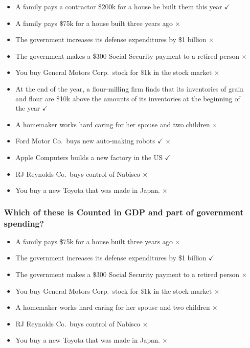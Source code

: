 \documentclass[
  letterpaper,
  DIV=11,
  numbers=noendperiod]{scrartcl}
\providecommand{\tightlist}{%
  \setlength{\itemsep}{0pt}\setlength{\parskip}{0pt}}\usepackage{longtable,booktabs,array}
\begin{document}
\begin{itemize}
\tightlist
\item
  A family pays a contractor \$200k for a house he built them this year
  \(\checkmark\)
\item
  A family pays \$75k for a house built three years ago \(\times\)
\item
  The government increases its defense expenditures by \$1 billion
  \(\times\)
\item
  The government makes a \$300 Social Security payment to a retired
  person \(\times\)
\item
  You buy General Motors Corp.~stock for \$1k in the stock market
  \(\times\)
\item
  At the end of the year, a flour-milling firm finds that its
  inventories of grain and flour are \$10k above the amounts of its
  inventories at the beginning of the year \(\checkmark\)
\item
  A homemaker works hard caring for her spouse and two children
  \(\times\)
\item
  Ford Motor Co.~buys new auto-making robots \(\checkmark\) \(\times\)
\item
  Apple Computers builds a new factory in the US \(\checkmark\)
\item
  RJ Reynolds Co.~buys control of Nabisco \(\times\)
\item
  You buy a new Toyota that was made in Japan. \(\times\)
\end{itemize}

\subsubsection{Which of these is Counted in GDP and part of government
spending?}\label{which-of-these-is-counted-in-gdp-and-part-of-government-spending}

\begin{itemize}
\tightlist
\item
  A family pays \$75k for a house built three years ago \(\times\)
\item
  The government increases its defense expenditures by \$1 billion
  \(\checkmark\)
\item
  The government makes a \$300 Social Security payment to a retired
  person \(\times\)
\item
  You buy General Motors Corp.~stock for \$1k in the stock market
  \(\times\)
\item
  A homemaker works hard caring for her spouse and two children
  \(\times\)
\item
  RJ Reynolds Co.~buys control of Nabisco \(\times\)
\item
  You buy a new Toyota that was made in Japan. \(\times\)
\end{itemize}
\end{document}

